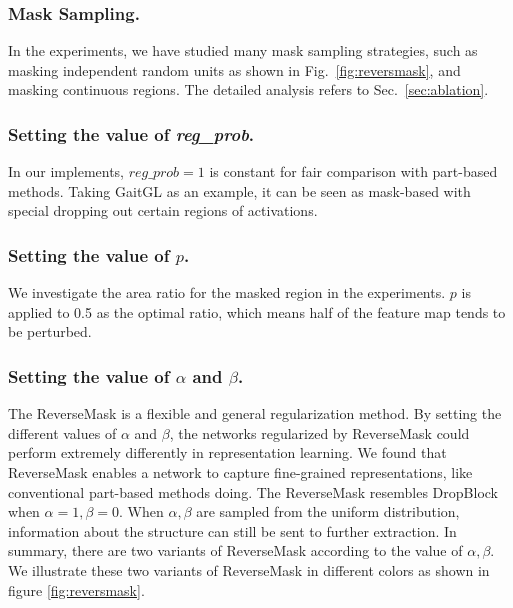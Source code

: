 \documentclass[runningheads]{llncs}
\begin{document}
\subsubsection{Mask Sampling.} In the experiments, we have studied many mask sampling strategies, such as masking independent random units as shown in Fig.~\ref{fig:reversmask}, and masking continuous regions. The detailed analysis refers to Sec.~\ref{sec:ablation}. 

\subsubsection{Setting the value of \textit{reg\_prob}.} In our implements, $reg\_prob=1$ is constant for fair comparison with part-based methods. Taking GaitGL as an example, it can be seen as mask-based with special dropping out certain regions of activations.

\subsubsection{Setting the value of $p$.} We investigate the area ratio for the masked region in the experiments. $p$ is applied to 0.5 as the optimal ratio, which means half of the feature map tends to be perturbed.

\subsubsection{Setting the value of $\alpha$ and $\beta$.} The ReverseMask is a flexible and general regularization method. By setting the different values of $\alpha$ and $\beta$, the networks regularized by ReverseMask could perform extremely differently in representation learning. We found that ReverseMask enables a network to capture fine-grained representations, like conventional part-based methods doing. The ReverseMask resembles DropBlock when $\alpha=1, \beta=0$. When $\alpha,\beta$ are sampled from the uniform distribution, information about the structure can still be sent to further extraction. In summary, there are two variants of ReverseMask according to the value of $\alpha,\beta$. We illustrate these two variants of ReverseMask in different colors as shown in figure \ref{fig:reversmask}.

\end{document}
